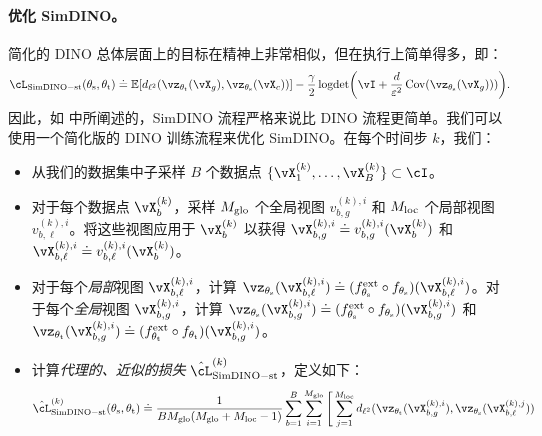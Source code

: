 \documentclass[../../book-main.tex]{subfiles}
\begin{document}
\paragraph{优化 SimDINO。} 简化的 DINO 总体层面上的目标在精神上非常相似，但在执行上简单得多，即：
\begin{equation}\label{eq:simdino_loss_teacherstudent}
    \cL_{\simdino-\student\teacher}(\theta_{\student}, \theta_{\teacher}) \doteq  \Ex\rs{d_{\ell^{2}}(\vz_{\theta_{\teacher}}(\vX_{g}), \vz_{\theta_{\student}}(\vX_{c}))} - \frac{\gamma}{2}\logdet\rp{\vI + \frac{d}{\eps^{2}}\Cov(\vz_{\theta_{\student}}(\vX_{g})))}.
\end{equation}
因此，如  中所阐述的，SimDINO 流程严格来说比 DINO 流程更简单。我们可以使用一个简化版的 DINO 训练流程来优化 SimDINO。在每个时间步 \(k\)，我们：
\begin{itemize}
    \item 从我们的数据集中子采样 \(B\) 个数据点 \(\{\vX_{1}^{(k)}, \dots, \vX_{B}^{(k)}\} \subset \cI\)。
    \item 对于每个数据点 \(\vX_{b}^{(k)}\)，采样 \(M_{\mathrm{glo}}\) 个全局视图 \(v_{b, g}^{(k), i}\) 和 \(M_{\mathrm{loc}}\) 个局部视图 \(v_{b, \ell}^{(k), i}\)。将这些视图应用于 \(\vX_{b}^{(k)}\) 以获得 \(\vX_{b, g}^{(k), i} \doteq v_{b, g}^{(k), i}(\vX_{b}^{(k)})\) 和 \(\vX_{b, \ell}^{(k), i} \doteq v_{b, \ell}^{(k), i}(\vX_{b}^{(k)})\)。
    \item 对于每个\textit{局部}视图 \(\vX_{b, \ell}^{(k), i}\)，计算 \(\vz_{\theta_{\student}}(\vX_{b, \ell}^{(k), i}) \doteq (f_{\theta_{\student}}^{\ext} \circ f_{\theta_{\student}})(\vX_{b, \ell}^{(k), i})\)。对于每个\textit{全局}视图 \(\vX_{b, g}^{(k), i}\)，计算 \(\vz_{\theta_{\student}}(\vX_{b, g}^{(k), i}) \doteq (f_{\theta_{\student}}^{\ext} \circ f_{\theta_{\student}})(\vX_{b, g}^{(k), i})\) 和 \(\vz_{\theta_{\teacher}}(\vX_{b, g}^{(k), i}) \doteq (f_{\theta_{\teacher}}^{\ext} \circ f_{\theta_{\teacher}})(\vX_{b, g}^{(k), i})\)。
    \item 计算\textit{代理的、近似的损失} \(\hat{\cL}_{\simdino-\student\teacher}^{(k)}\)，定义如下：
    \begin{align}\label{eq:simdino_loss_teacherstudent_empirical}
        &\hat{\cL}_{\simdino{}-\student\teacher}^{(k)}(\theta_{\student}, \theta_{\teacher}) \doteq
        \frac{1}{BM_{\glo}(M_{\glo} + M_{\loc} - 1)}\sum_{b = 1}^{B}\sum_{i = 1}^{M_{\glo}}\Bigg[\sum_{j = 1}^{M_{\loc}}d_{\ell^{2}}(\vz_{\theta_{\teacher}}(\vX_{b, g}^{(k), i}), \vz_{\theta_{\student}}(\vX_{b, \ell}^{(k), j})) \\ 

\end{align}
\end{itemize}
\end{document}
